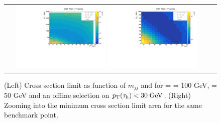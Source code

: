 \begin{figure}[tbh!]
	\centering
	\begin{tabular}{cc}
		\includegraphics[width=0.45\textwidth]{analysis/pics/JetInvMass_vs_MET_xsec_chi100_lsp050_taupt30.pdf}
		\includegraphics[width=0.45\textwidth]{analysis/pics/JetInvMass_vs_MET_xsec_chi100_lsp050_taupt30_zoom.pdf} 		
	\end{tabular}
	\caption{(Left) Cross section limit as function of $m_{jj}$ and \met for \charginopm = \neutralinotwo = 100 GeV, \neutralinoone = 50 GeV and an offline selection on $p_{\text{T}}(\tau_{\text{h}}) <  30\;\text{Ge}\kern-0.06667em\text{V}$. (Right) Zooming into the minimum cross section limit area for the same benchmark point.}
	\label{fig::JetInvMass_vs_MET_xsec_chi100_lsp050_taupt30}
\end{figure}

